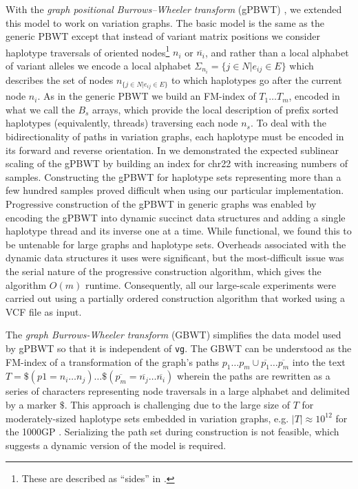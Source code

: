 With the \emph{graph positional Burrows–Wheeler transform} (gPBWT) \cite{Novak2017gPBWT}, we extended this model to work on variation graphs.
The basic model is the same as the generic PBWT except that instead of variant matrix positions we consider haplotype traversals of oriented nodes\footnote{These are described as ``sides'' in \cite{Novak2017gPBWT}.} $n_i$ or $\overline{n_i}$, and rather than a local alphabet of variant alleles we encode a local alphabet $\Sigma_{n_i} = \{ j \in N | e_{ij} \in E \}$ which describes the set of nodes $n_{\{j \in N | e_{ij} \in E \}}$ to which haplotypes go after the current node $n_i$.
As in the generic PBWT we build an FM-index of $T_1 \ldots T_m$, encoded in what we call the $B_s$ arrays, which provide the local description of prefix sorted haplotypes (equivalently, threads) traversing each node $n_s$.
To deal with the bidirectionality of paths in variation graphs, each haplotype must be encoded in its forward and reverse orientation.
In \cite{Novak2017gPBWT} we demonstrated the expected sublinear scaling of the gPBWT by building an index for chr22 with increasing numbers of samples.
Constructing the gPBWT for haplotype sets representing more than a few hundred samples proved difficult when using our particular implementation.
Progressive construction of the gPBWT in generic graphs was enabled by encoding the gPBWT into dynamic succinct data structures and adding a single haplotype thread and its inverse one at a time.
While functional, we found this to be untenable for large graphs and haplotype sets.
Overheads associated with the dynamic data structures it uses were significant, but the most-difficult issue was the serial nature of the progressive construction algorithm, which gives the algorithm $O(m)$ runtime.
Consequently, all our large-scale experiments were carried out using a partially ordered construction algorithm that worked using a VCF file as input.

The \emph{graph Burrows-Wheeler transform} (GBWT) \cite{siren2018haplotype} simplifies the data model used by gPBWT so that it is independent of {\tt vg}.
The GBWT can be understood as the FM-index of a transformation of the graph's paths $p_1\ldots p_m \cup \overline{p_1}\ldots \overline{p_m}$ into the text $T = \$( p1 = n_i\ldots n_j) \ldots \$ (\overline{p_m} = \overline{n_j} \ldots \overline{n_i}) $ wherein the paths are rewritten as a series of characters representing node traversals in a large alphabet and delimited by a marker $\$$.
This approach is challenging due to the large size of $T$ for moderately-sized haplotype sets embedded in variation graphs, e.g. $|T| \approx 10^{12}$ for the 1000GP \cite{siren2018haplotype}.
Serializing the path set during construction is not feasible, which suggests a dynamic version of the model is required.

